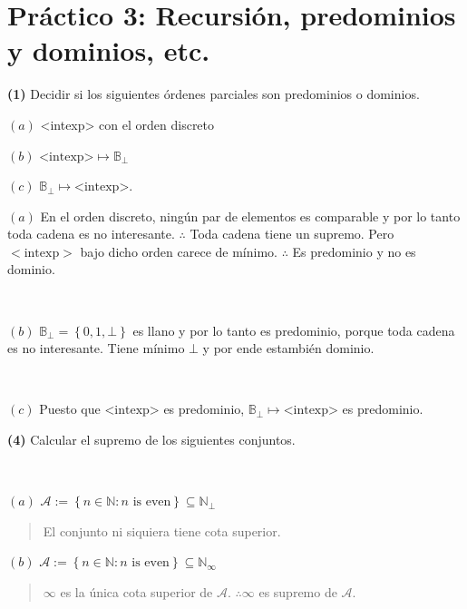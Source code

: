 \documentclass[article, 12pt]{article}
\begin{document}
\pagebreak
\section{Práctico 3: Recursión, predominios y dominios, etc.}


\begin{myframe}
\textbf{(1)} Decidir si los siguientes órdenes parciales son predominios o
dominios.

$(a)$ <intexp> con el orden discreto

$(b)$ $\text{<intexp>} \mapsto
\mathbb{B}_{\bot}$

$(c)$ $\mathbb{B}_\bot \mapsto \text{<intexp>}$.
\end{myframe}

$(a)$ En el orden discreto, ningún par de elementos es comparable y por lo tanto
toda cadena es no interesante. $\therefore $ Toda cadena tiene un supremo. Pero
$<\text{intexp}>$ bajo dicho orden carece de mínimo. $\therefore $ Es
predominio y no es dominio.

~


$(b)$ $\mathbb{B}_\bot = \left\{ 0,1, \bot  \right\} $ es llano y por lo tanto
es predominio, porque toda cadena es no interesante. Tiene mínimo $\bot$ y por
ende estambién dominio.

~

$(c)$ Puesto que $\text{<intexp>}$ es predominio,
$\mathbb{B}_\bot \mapsto \text{<intexp>}$ es predominio.


\pagebreak 

\begin{myframe}
\textbf{(4)} Calcular el supremo de los siguientes conjuntos.
\end{myframe}

~ 

$(a)$ $\mathcal{A} := \left\{ n \in \mathbb{N} : n \text{ is even} \right\}
\subseteq \mathbb{N}_{\bot} $


\small
\begin{quote}

  El conjunto ni siquiera tiene cota superior. 

\end{quote}
\normalsize

$(b)$ $\mathcal{A} := \left\{ n \in \mathbb{N} : n \text{ is even} \right\}
\subseteq \mathbb{N}_{\infty} $


\small
\begin{quote}

$\infty $ es la única cota superior de $\mathcal{A}$. $\therefore \infty$ es
supremo de $\mathcal{A}$.

\end{quote}
\normalsize
\end{document}
